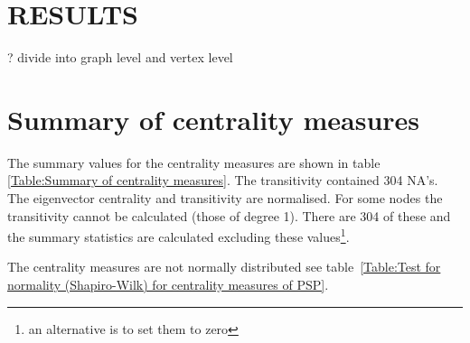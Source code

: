 










\section{RESULTS}
? divide into graph level and vertex level

\section{Summary of centrality measures}

The summary values for the centrality measures are shown in table \ref{Table:Summary of centrality measures}. The transitivity contained 304 NA's.
The eigenvector centrality and transitivity are normalised. For some nodes the transitivity cannot be calculated (those of degree 1). There are 304 of these and the summary statistics are calculated excluding these values\footnote{an alternative is to set them to zero}. 

The centrality measures are not normally distributed see table~\ref{Table:Test for normality (Shapiro-Wilk) for centrality measures of PSP}.



